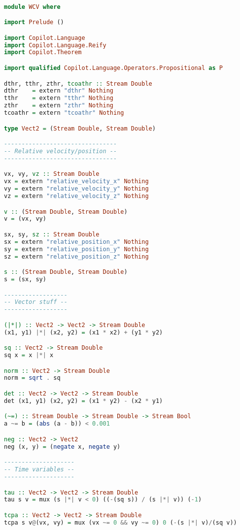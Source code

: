 { \footnotesize
\begin{lstlisting}[language=Haskell]

module WCV where

import Prelude ()

import Copilot.Language
import Copilot.Language.Reify
import Copilot.Theorem

import qualified Copilot.Language.Operators.Propositional as P

dthr, tthr, zthr, tcoathr :: Stream Double
dthr    = extern "dthr" Nothing
tthr    = extern "tthr" Nothing
zthr    = extern "zthr" Nothing
tcoathr = extern "tcoathr" Nothing

type Vect2 = (Stream Double, Stream Double)

--------------------------------
-- Relative velocity/position --
--------------------------------

vx, vy, vz :: Stream Double
vx = extern "relative_velocity_x" Nothing
vy = extern "relative_velocity_y" Nothing
vz = extern "relative_velocity_z" Nothing

v :: (Stream Double, Stream Double)
v = (vx, vy)

sx, sy, sz :: Stream Double
sx = extern "relative_position_x" Nothing
sy = extern "relative_position_y" Nothing
sz = extern "relative_position_z" Nothing

s :: (Stream Double, Stream Double)
s = (sx, sy)

------------------
-- Vector stuff --
------------------

(|*|) :: Vect2 -> Vect2 -> Stream Double
(x1, y1) |*| (x2, y2) = (x1 * x2) + (y1 * y2)

sq :: Vect2 -> Stream Double
sq x = x |*| x

norm :: Vect2 -> Stream Double
norm = sqrt . sq

det :: Vect2 -> Vect2 -> Stream Double
det (x1, y1) (x2, y2) = (x1 * y2) - (x2 * y1)

(~=) :: Stream Double -> Stream Double -> Stream Bool
a ~= b = (abs (a - b)) < 0.001

neg :: Vect2 -> Vect2
neg (x, y) = (negate x, negate y)

--------------------
-- Time variables --
--------------------

tau :: Vect2 -> Vect2 -> Stream Double
tau s v = mux (s |*| v < 0) ((-(sq s)) / (s |*| v)) (-1)

tcpa :: Vect2 -> Vect2 -> Stream Double
tcpa s v@(vx, vy) = mux (vx ~= 0 && vy ~= 0) 0 (-(s |*| v)/(sq v))


\end{lstlisting}}
